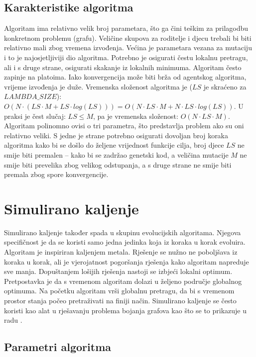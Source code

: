 \documentclass[times, utf8, diplomski, numeric]{fer}
\begin{document}
\subsection{Karakteristike algoritma}

Algoritam ima relativno velik broj parametara, što ga čini teškim za prilagodbu konkretnom problemu (grafu). Veličine skupova za roditelje i djecu trebali bi biti relativno mali zbog vremena izvođenja. Većina je parametara vezana za mutaciju i to je najosjetljiviji dio algoritma. Potrebno je osigurati čestu lokalnu pretragu, ali i s druge strane, osigurati skakanje iz lokalnih minimuma. Algoritam često zapinje na platoima. Iako konvergencija može biti brža od agentskog algoritma, vrijeme izvođenja je duže.
Vremenska složenost algoritma je ($LS$ je skraćeno za $LAMBDA\_SIZE$): $O(N\cdot(LS \cdot M + LS\cdot log(LS)))=O(N\cdot LS\cdot M + N\cdot LS \cdot log(LS))$. U praksi je čest slučaj: $LS\le M$, pa je vremenska složenost: $O(N\cdot LS \cdot M)$. Algoritam polinomno ovisi o tri parametra, što predstavlja problem ako su oni relativno veliki. S jedne je strane potrebno osigurati dovoljan broj koraka algoritma kako bi se došlo do željene vrijednost funkcije cilja, broj djece $LS$ ne smije biti premalen -- kako bi se zadržao genetski kod, a veličina mutacije $M$ ne smije biti prevelika zbog velikog odstupanja, a s druge strane ne smije biti premala zbog spore konvergencije. 

\section{Simulirano kaljenje}

Simulirano kaljenje također spada u skupinu evolucijskih algoritama. Njegova specifičnost je da se koristi samo jedna jedinka koja iz koraka u korak evoluira. Algoritam je inspiriran kaljenjem metala. Rješenje se nužno ne poboljšava iz koraka u korak, ali je vjerojatnost pogoršanja rješenja kako algoritam napreduje sve manja. Dopuštanjem lošijih rješenja nastoji se izbjeći lokalni optimum. Pretpostavka je da s vremenom algoritam dolazi u željeno područje globalnog optimuma. Na početku algoritam vrši globalnu pretragu, da bi s vremenom prostor stanja počeo pretraživati na finiji način. Simulirano kaljenje se često koristi kao alat u rješavanju problema bojanja grafova kao što se to prikazuje u radu \cite{lit13}.

\subsection{Parametri algoritma}
\end{document}

